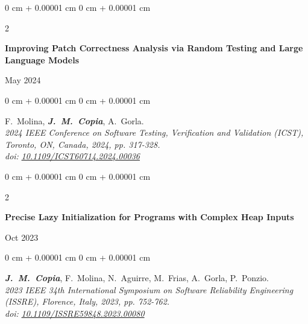 \documentclass[10pt, letterpaper]{article}
\newenvironment{onecolentry}{
    \begin{adjustwidth}{
        0 cm + 0.00001 cm
    }{
        0 cm + 0.00001 cm
    }
}{
    \end{adjustwidth}
} %
\newenvironment{twocolentry}[2][]{
    \onecolentry
    \def\secondColumn{#2}
    \setcolumnwidth{\fill, 4.5 cm}
    \begin{paracol}{2}
}{
    \switchcolumn \raggedleft \secondColumn
    \end{paracol}
    \endonecolentry
} %
\begin{document}
        \begin{samepage}
            \begin{twocolentry}{
                May 2024
            }
                \textbf{Improving Patch Correctness Analysis via Random Testing and Large
                Language Models}
            \end{twocolentry}

            \vspace{0.1 cm}
            \begin{onecolentry}
                \mbox{F. Molina}, \mbox{\textbf{\textit{J. M. Copia}}}, \mbox{A.
                Gorla}. \\ \textit{2024 IEEE Conference on Software Testing, Verification and
                Validation (ICST), Toronto, ON, Canada, 2024, pp. 317-328.} \\ \textit{doi:}
                \href{https://doi.org/10.1109/ICST60714.2024.00036}{\textit{10.1109/ICST60714.2024.00036}}

            \end{onecolentry}
        \end{samepage}

        \vspace{0.2 cm}

        \begin{samepage}
            \begin{twocolentry}{
                Oct 2023
            }
                \textbf{Precise Lazy Initialization for Programs with Complex Heap Inputs}
            \end{twocolentry}

            \vspace{0.10 cm}
            \begin{onecolentry}
                \mbox{\textbf{\textit{J. M. Copia}}}, \mbox{F. Molina}, \mbox{N.
                Aguirre}, \mbox{M. Frias}, \mbox{A. Gorla}, \mbox{P. Ponzio}. \\
                \textit{2023 IEEE 34th International Symposium on Software Reliability
                Engineering (ISSRE), Florence, Italy, 2023, pp. 752-762.} \\ \textit{doi:}
                \href{https://doi.org/10.1109/ISSRE59848.2023.00080}{\textit{10.1109/ISSRE59848.2023.00080}}

            \end{onecolentry}

        \end{samepage}
\end{document}
